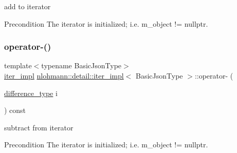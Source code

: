 add to iterator 

\begin{DoxyPrecond}{Precondition}
The iterator is initialized; i.\+e. {\ttfamily m\+\_\+object != nullptr}. 
\end{DoxyPrecond}
\mbox{\label{classnlohmann_1_1detail_1_1iter__impl_a0dd9c415b94a02ff2aa25da75e52da30}} 
\subsubsection{\texorpdfstring{operator-\/()}{operator-()}\hspace{0.1cm}{\footnotesize\ttfamily [1/2]}}
{\footnotesize\ttfamily template$<$typename Basic\+Json\+Type$>$ \\
\mbox{\hyperlink{classnlohmann_1_1detail_1_1iter__impl}{iter\+\_\+impl}} \mbox{\hyperlink{classnlohmann_1_1detail_1_1iter__impl}{nlohmann\+::detail\+::iter\+\_\+impl}}$<$ Basic\+Json\+Type $>$\+::operator-\/ (\begin{DoxyParamCaption}\item[{\mbox{\hyperlink{classnlohmann_1_1detail_1_1iter__impl_a2f7ea9f7022850809c60fc3263775840}{difference\+\_\+type}}}]{i }\end{DoxyParamCaption}) const\hspace{0.3cm}{\ttfamily [inline]}}



subtract from iterator 

\begin{DoxyPrecond}{Precondition}
The iterator is initialized; i.\+e. {\ttfamily m\+\_\+object != nullptr}. 
\end{DoxyPrecond}
\mbox{\label{classnlohmann_1_1detail_1_1iter__impl_a49bf3e708a9c1c88c415011735962d06}} 
